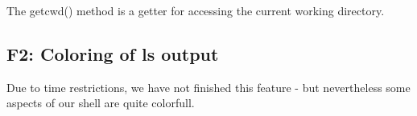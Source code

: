 The getcwd() method is a getter for accessing the current working directory.

\subsection{F2: Coloring of ls output}
Due to time restrictions, we have not finished this feature - but nevertheless some aspects of our  shell are quite colorfull.